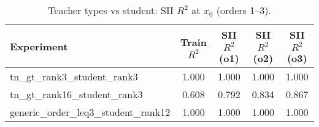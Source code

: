 \begin{table}[t]
\centering
\small
\begin{tabular}{lcccc}
\toprule
Experiment & Train $R^2$ & SII $R^2$ (o1) & SII $R^2$ (o2) & SII $R^2$ (o3) \\
\midrule
tn_gt_rank3_student_rank3 & 1.000 & 1.000 & 1.000 & 1.000 \\
tn_gt_rank16_student_rank3 & 0.608 & 0.792 & 0.834 & 0.867 \\
generic_order_leq3_student_rank12 & 1.000 & 1.000 & 1.000 & 1.000 \\
\bottomrule
\end{tabular}
\caption{Teacher types vs student: SII $R^2$ at $x_0$ (orders 1–3).}
\label{tab:core-teachers}
\end{table}